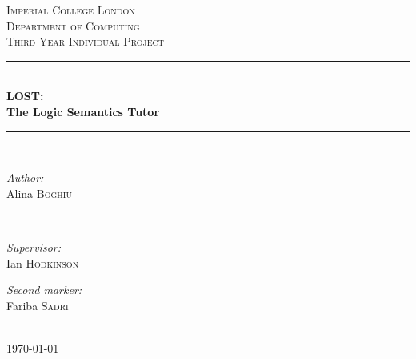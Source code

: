 \documentclass{report}
\begin{document}

\begin{titlepage}
\newcommand{\HRule}{\rule{\linewidth}{0.5mm}}
\center
\textsc{\LARGE Imperial College London}  \\[0.5cm]
\textsc{\Large Department of Computing}  \\[0.5cm]
\textsc{\large Third Year Individual Project} \\[1.5cm]
\HRule \\[0.3cm]
{\huge \bfseries LOST: \\[0.2cm] The Logic Semantics Tutor} \\[0.3cm]
\HRule \\[1.5cm]

\begin{minipage}{0.4\textwidth}
\begin{flushleft} \large \emph{Author:} \\
 Alina  \textsc{Boghiu}
\end{flushleft}
\end{minipage}~
\begin{minipage}{0.4\textwidth}
\begin{flushright} \large \emph{Supervisor:} \\
 Ian \textsc{Hodkinson}
\end{flushright}
\begin{flushright} \large \emph{Second marker:} \\
 Fariba \textsc{Sadri}
\end{flushright}
\end{minipage}\\[4cm]
{\large \today}\\[3cm]
\vfill
\end{titlepage}

\end{document}
